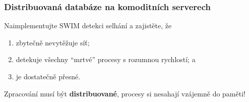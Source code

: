 \documentclass[usenames,dvipsnames,9pt]{beamer}
\begin{document}
\begin{frame}
  \frametitle{Distribuovaná databáze na komoditních serverech}
  Naimplementujte SWIM detekci selhání a zajistěte, že
  \begin{enumerate}
    \item zbytečně nevytěžuje síť;
    \item detekuje všechny ``mrtvé'' procesy s rozumnou rychlostí; a
    \item je dostatečně přesné.
  \end{enumerate}

  Zpracování musí být {\bf distribuované}, procesy si nesahají vzájemně do paměti!






\end{frame}


\framefeedback{}
\end{document}
